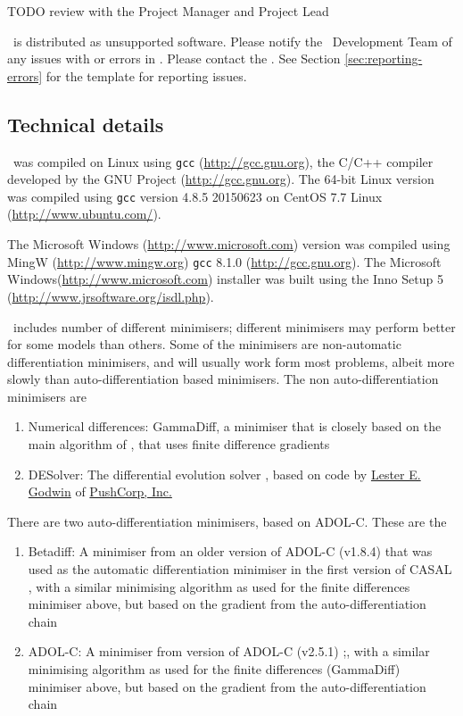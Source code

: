 TODO review with the Project Manager and Project Lead

\CNAME\ is distributed as unsupported software. Please notify the \CNAME\ Development Team of any issues with or errors in \CNAME. Please contact the \emaillink. See Section \ref{sec:reporting-errors} for the template for reporting issues.

\subsection{Technical details}\label{sec:TechnicalDetails}

\CNAME\ was compiled on Linux using \texttt{gcc} (\url{http://gcc.gnu.org}), the C/C++ compiler developed by the GNU Project (\url{http://gcc.gnu.org}). The 64-bit Linux  version was compiled using \texttt{gcc} version 4.8.5 20150623 on CentOS 7.7 Linux (\url{http://www.ubuntu.com/}).

The Microsoft Windows (\url{http://www.microsoft.com}) version was compiled using MingW (\url{http://www.mingw.org}) \texttt{gcc} 8.1.0 (\url{http://gcc.gnu.org}). The Microsoft Windows(\url{http://www.microsoft.com}) installer was built using the Inno Setup 5 (\url{http://www.jrsoftware.org/isdl.php}).

\CNAME\ includes number of different minimisers; different minimisers may perform better for some models than others. Some of the minimisers are non-automatic differentiation minimisers, and will usually work form most problems, albeit more slowly than auto-differentiation based minimisers. The non auto-differentiation minimisers are 
\begin{enumerate}
\item Numerical differences: GammaDiff, a minimiser that is closely based on the main algorithm of \cite{779}, that uses finite difference gradients
\item DESolver: The differential evolution solver \citep{1442}, based on code by \href{mailto:<godwin@pushcorp.com>}{Lester E. Godwin} of \href{http://www.pushcorp.com}{PushCorp, Inc.}
\end{enumerate}

There are two auto-differentiation minimisers, based on ADOL-C. These are the
\begin{enumerate}
\item Betadiff: A minimiser from an older version of ADOL-C (v1.8.4) that was used as the automatic differentiation minimiser in the first version of CASAL \citep{1388}, with a similar minimising algorithm as used for the finite differences minimiser above, but based on the gradient from the auto-differentiation chain
\item ADOL-C: A minimiser from version of ADOL-C (v2.5.1) \citep{walther1996adolc};, with a similar minimising algorithm as used for the finite differences (GammaDiff) minimiser above, but based on the gradient from the auto-differentiation chain
\end{enumerate}

